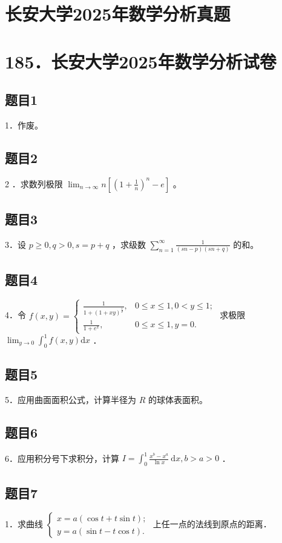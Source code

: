 \documentclass{article}
\begin{document}
\section*{长安大学2025年数学分析真题}
\section*{185．长安大学2025年数学分析试卷}

\subsection{题目1}
1．作废。

\subsection{题目2}
2 ．求数列极限 \(\lim _{n \rightarrow \infty} n\left[\left(1+\frac{1}{n}\right)^{n}-e\right]\) 。

\subsection{题目3}
3．设 \(p \geq 0, q>0, s=p+q\) ，求级数 \(\sum_{n=1}^{\infty} \frac{1}{(s n-p)(s n+q)}\) 的和。

\subsection{题目4}
4．令 \(f(x, y)=\left\{\begin{array}{ll}\frac{1}{1+(1+x y)^{\frac{1}{\nu}}}, & 0 \leq x \leq 1,0<y \leq 1 ; \\ \frac{1}{1+e^{x}}, & 0 \leq x \leq 1, y=0 .\end{array}\right.\) 求极限 \(\lim _{y \rightarrow 0} \int_{0}^{1} f(x, y) \mathrm{d} x\) ．

\subsection{题目5}
5．应用曲面面积公式，计算半径为 \(R\) 的球体表面积。

\subsection{题目6}
6．应用积分号下求积分，计算 \(I=\int_{0}^{1} \frac{x^{b}-x^{a}}{\ln x} \mathrm{~d} x, b>a>0\) ．

\subsection{题目7}
1．求曲线 \(\left\{\begin{array}{l}x=a(\cos t+t \sin t) ; \\ y=a(\sin t-t \cos t) .\end{array}\right.\) 上任一点的法线到原点的距离．
\end{document}
